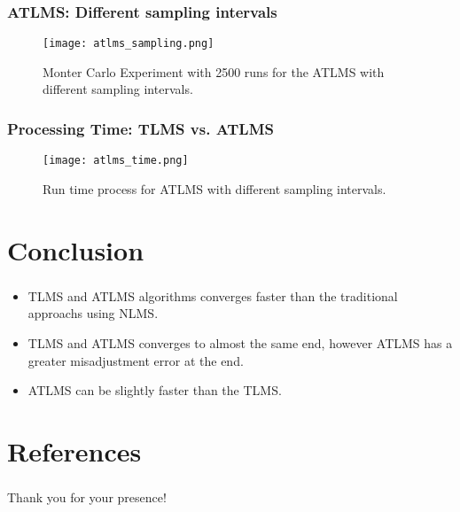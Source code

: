 \documentclass[10pt]{beamer}
\begin{document}
\begin{frame}
    \frametitle{ATLMS: Different sampling intervals}
    \begin{figure}
        \centering
        \texttt{[image: atlms\_sampling.png]}
        \caption{Monter Carlo Experiment with 2500 runs for the ATLMS with different sampling intervals.}
        \label{fig:atlms_sampling} 
    \end{figure}
\end{frame}

\begin{frame}
    \frametitle{Processing Time: TLMS vs. ATLMS}
    \begin{figure}
        \centering
        \texttt{[image: atlms\_time.png]}
        \caption{Run time process for ATLMS with different sampling intervals.}
        \label{fig:atlms_time} 
    \end{figure}
\end{frame}

\section{Conclusion}
\begin{frame}[allowframebreaks]
    \frametitle{\insertsection}
    \begin{itemize}
        \item TLMS and ATLMS algorithms converges faster than the traditional approachs using NLMS.
        \item TLMS and ATLMS converges to almost the same end, however ATLMS has a greater misadjustment error at the end.
        \item ATLMS can be slightly faster than the TLMS.
    \end{itemize}
\end{frame}

\section*{References}
\begin{frame} 
    \frametitle{\insertsection}
    
    
\end{frame}

\begin{frame}
    \begin{center}
        \Huge Thank you for your presence!
    \end{center}
\end{frame}
\end{document}
